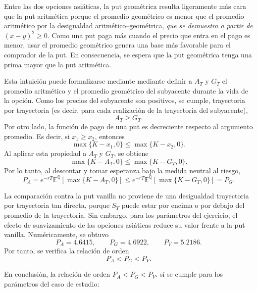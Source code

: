 \documentclass[11pt,letterpaper]{article}
\begin{document}
Entre las dos opciones asiáticas, la put geométrica resulta ligeramente más cara que la put aritmética porque el promedio geométrico es menor que el promedio aritmético por la desigualdad aritmético--geométrica, \textit{que se demuestra a partir de \( (x-y)^2 \geq 0 \)}. Como una put paga más cuando el precio que entra en el pago es menor, usar el promedio geométrico genera una base más favorable para el comprador de la put. En consecuencia, se espera que la put geométrica tenga una prima mayor que la put aritmética.

Esta intuición puede formalizarse mediante mediante definir a \(A_T\) y \(G_T\) el promedio aritmético y el promedio geométrico del subyacente durante la vida de la opción. Como los precios del subyacente son positivos, se cumple, trayectoria por trayectoria (es decir, para cada realización de la trayectoria del subyacente),
\begin{equation}
A_T\geq G_T.
\end{equation}
Por otro lado, la función de pago de una put es decreciente respecto al argumento promedio. Es decir, si \(x_1\geq x_2\), entonces
\[
\max\{K-x_1, 0\}\leq \max\{K-x_2, 0\}.
\]
Al aplicar esta propiedad a \(A_T\) y \(G_T\), se obtiene
\begin{equation}
\max\{K-A_T, 0\}\leq \max\{K-G_T, 0\}.
\end{equation}
Por lo tanto, al descontar y tomar esperanza bajo la medida neutral al riesgo,
\begin{equation}
P_A
=
e^{-rT}\mathbb{E}^{\mathbb{Q}}\!\left[\max\{K-A_T, 0\}\right]
\leq
e^{-rT}\mathbb{E}^{\mathbb{Q}}\!\left[\max\{K-G_T, 0\}\right]
=
P_G.
\end{equation}

La comparación contra la put vanilla no proviene de una desigualdad trayectoria por trayectoria tan directa, porque \(S_T\) puede estar por encima o por debajo del promedio de la trayectoria. Sin embargo, para los parámetros del ejercicio, el efecto de suavizamiento de las opciones asiáticas reduce su valor frente a la put vanilla. Numéricamente, se obtuvo
\[
P_A=4.6415,
\qquad
P_G=4.6922,
\qquad
P_V=5.2186.
\]
Por tanto, se verifica la relación de orden
\begin{equation}
P_A<P_G<P_V.
\end{equation}

En conclusión, la relación de orden \(P_A<P_G<P_V.\) sí se cumple para los parámetros del caso de estudio:

\resultbox{
\[
P_{\mathrm{arit}}=4.6415
<
P_{\mathrm{geom}}=4.6922
<
P_{\mathrm{vanilla}}=5.2186.
\]
}
\end{document}
